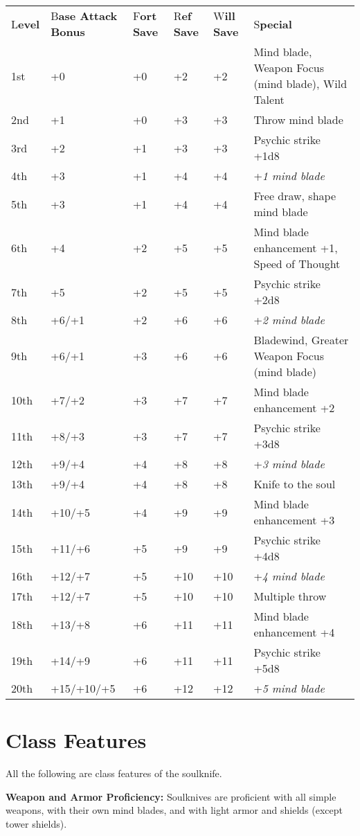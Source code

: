 \documentclass{article}
\begin{document}
\vspace{12pt}
\begin{tabular}{|>{\raggedright}p{18pt}|>{\raggedright}p{35pt}|>{\raggedright}p{16pt}|>{\raggedright}p{17pt}|>{\raggedright}p{23pt}|>{\raggedright}p{167pt}|}
\hline
\multicolumn{6}{|p{278pt}|}{T\textbf{able: The Soulknife}}\tabularnewline
\hline
L\textbf{evel} & B\textbf{ase Attack Bonus} & F\textbf{ort Save} & R\textbf{ef 
Save} & W\textbf{ill Save} & S\textbf{pecial}\tabularnewline
\hline
1st & +0 & +0 & +2 & +2 & Mind blade, Weapon Focus (mind blade), Wild Talent\tabularnewline
\hline
2nd & +1 & +0 & +3 & +3 & Throw mind blade\tabularnewline
\hline
3rd & +2 & +1 & +3 & +3 & Psychic strike +1d8\tabularnewline
\hline
4th & +3 & +1 & +4 & +4 & +\textit{1 mind blade}\tabularnewline
\hline
5th & +3 & +1 & +4 & +4 & Free draw, shape mind blade\tabularnewline
\hline
6th & +4 & +2 & +5 & +5 & Mind blade enhancement +1, Speed of Thought\tabularnewline
\hline
7th & +5 & +2 & +5 & +5 & Psychic strike +2d8\tabularnewline
\hline
8th & +6/+1 & +2 & +6 & +6 & +\textit{2 mind blade}\tabularnewline
\hline
9th & +6/+1 & +3 & +6 & +6 & Bladewind, Greater Weapon Focus (mind blade)\tabularnewline
\hline
10th & +7/+2 & +3 & +7 & +7 & Mind blade enhancement +2\tabularnewline
\hline
11th & +8/+3 & +3 & +7 & +7 & Psychic strike +3d8\tabularnewline
\hline
12th & +9/+4 & +4 & +8 & +8 & +\textit{3 mind blade}\tabularnewline
\hline
13th & +9/+4 & +4 & +8 & +8 & Knife to the soul\tabularnewline
\hline
14th & +10/+5 & +4 & +9 & +9 & Mind blade enhancement +3\tabularnewline
\hline
15th & +11/+6 & +5 & +9 & +9 & Psychic strike +4d8\tabularnewline
\hline
16th & +12/+7 & +5 & +10 & +10 & +\textit{4 mind blade}\tabularnewline
\hline
17th & +12/+7 & +5 & +10 & +10 & Multiple throw\tabularnewline
\hline
18th & +13/+8 & +6 & +11 & +11 & Mind blade enhancement +4\tabularnewline
\hline
19th & +14/+9 & +6 & +11 & +11 & Psychic strike +5d8\tabularnewline
\hline
20th & +15/+10/+5 & +6 & +12 & +12 & +\textit{5 mind blade}\tabularnewline
\hline
\end{tabular}

\vspace{12pt}
\section*{\textbf{Class Features}}

All the following are class features of the soulknife.

\textbf{Weapon and Armor Proficiency:} Soulknives are proficient with all simple 
weapons, with their own mind blades, and with light armor and shields (except tower 
shields).
\end{document}
